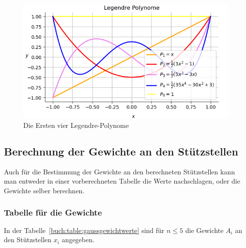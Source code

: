 \begin{figure}
    \centering
    \includegraphics[scale=0.7]{papers/quadratur/figures/Legendrepolynomial.png}
    \caption{ Die Ersten vier Legendre-Polynome
    \label{quadratur:figure:legendrepolynomial}}
\end{figure}

\subsection{Berechnung der Gewichte an den Stützstellen
\label{quadratur:subsection:gewichtsberechnung}}
Auch für die Bestimmung der Gewichte an den berechneten Stützstellen kann man entweder
in einer vorberechneten Tabelle die Werte nachschlagen, oder die Gewichte selber berechnen.

\subsubsection{Tabelle für die Gewichte}
In der Tabelle~\ref{buch:table:gaussgewichtwerte} sind für $ n \leq 5 $ die Gewichte $A_{i}$
an den Stützstellen $x_{i} $ angegeben.

